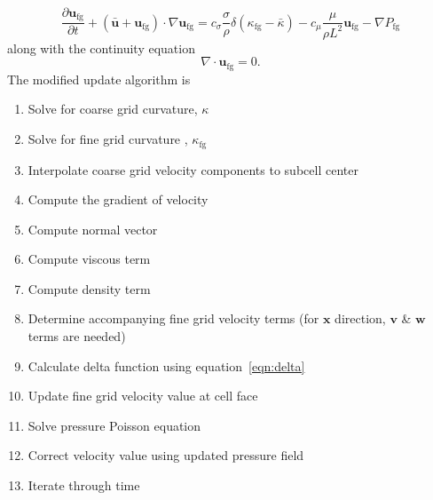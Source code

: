 \begin{equation}
\frac{\partial \bm{u}_{\text{fg}}}{\partial t} +
(\bar{\bm{u}}+\bm{u}_{\text{fg}}) \cdot \nabla \bm{u}_{\text{fg}} = 
c_{\sigma}\frac{\sigma}{\rho}\delta(\kappa_{\text{fg}}-\bar{\kappa})- 
c_{\mu}\frac{\mu}{\rho L^2}\bm{u}_{\text{fg}} -
\nabla P_{\text{fg}}\nonumber
\label{eqn:MyEq}
\end{equation}
along with the continuity equation
\begin{equation}
\nabla\cdot\bm{u}_\text{fg}=0.
\end{equation}
The modified update algorithm is 
\begin{enumerate}
	\item Solve for coarse grid curvature, $\kappa$
	\item Solve for fine grid curvature , $\kappa_{\text{fg}}$
	\item Interpolate coarse grid velocity components to subcell center
	\item Compute the gradient of velocity
	\item Compute normal vector 
	\item Compute viscous term 
	\item Compute density term
	\item Determine accompanying fine grid velocity terms (for $\bm{x}$ direction, $\bm{v}$ \& $\bm{w}$ terms are needed) 
	\item Calculate delta function using equation~\ref{eqn:delta}
	\item Update fine grid velocity value at cell face
	\item Solve pressure Poisson equation 
	\item Correct velocity value using updated pressure field 
	\item Iterate through time
\end{enumerate}
